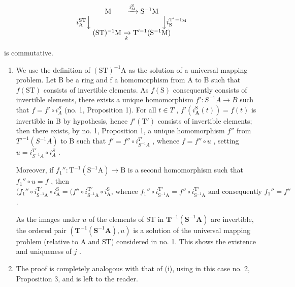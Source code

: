 \[
\begin{array}{c} \mathrm{M} \qquad \xrightarrow {i _ {\mathrm{M}} ^ {\mathrm{S}}} \mathrm{S} ^ {- 1} \mathrm{M} \\ i _ {\mathrm{A}} ^ {\mathrm{ST}} \Big \downarrow \qquad \qquad \qquad \qquad \qquad \Big \downarrow i _ {\mathrm{S}} ^ {\mathrm{T} ^ {\prime} - 1 _ {\mathrm{M}}} \\ (\mathrm{ST}) ^ {- 1} \mathrm{M} \xrightarrow [ k ]{} \mathrm{T} ^ {\prime - 1} (\mathrm{S} ^ {- 1} \mathrm{M}) \end{array}
\]

is commutative.

\begin{enumerate}
\def\labelenumi{(\roman{enumi})}
\tightlist
\item
  We use the definition of \((\mathrm{ST})^{-1}\mathrm{A}\) as the solution of a universal mapping problem. Let B be a ring and f a homomorphism from A to B such that \(f(\mathrm{ST})\) consists of invertible elements. As \(f(\mathrm{S})\) consequently consists of invertible elements, there exists a unique homomorphism \(f': S^{-1}A \to B\) such that \(f = f' \circ i_{A}^{S}\) (no. 1, Proposition 1). For all \(t \in T\) , \(f'(i_{\mathbf{A}}^{\mathrm{S}}(t)) = f(t)\) is invertible in B by hypothesis, hence \(f'(\mathrm{T}')\) consists of invertible elements; then there exists, by no. 1, Proposition 1, a unique homomorphism \(f''\) from \(T'^{-1}(S^{-1}A)\) to B such that \(f' = f'' \circ i_{S^{-1}A}^{T'}\) , whence \(f = f'' \circ u\) , setting \(u = i_{S^{-1}A}^{T'} \circ i_{A}^{S}\) .

Moreover, if \(f_1'' \colon \mathrm{T}^{-1}(\mathrm{S}^{-1}\mathrm{A}) \to \mathrm{B}\) is a second homomorphism such that \(f_1'' \circ u = f\) , then \((f_1'' \circ i_{\mathrm{S}^{-1}\mathrm{A}}^{\mathrm{T}'} \circ i_{\mathrm{A}}^{\mathrm{S}} = (f'' \circ i_{\mathrm{S}^{-1}\mathrm{A}}^{\mathrm{T}'} \circ i_{\mathrm{A}}^{\mathrm{S}} \text{, whence } f_1'' \circ i_{\mathrm{S}^{-1}\mathrm{A}}^{\mathrm{T}'} = f'' \circ i_{\mathrm{S}^{-1}\mathrm{A}}^{\mathrm{T}'} \text{ and consequently } f_1'' = f''\) .

As the images under \(u\) of the elements of ST in \(\mathbf{T}^{-1}(\mathbf{S}^{-1}\mathbf{A})\) are invertible, the ordered pair \((\mathbf{T}^{-1}(\mathbf{S}^{-1}\mathbf{A}), u)\) is a solution of the universal mapping problem (relative to A and ST) considered in no. 1. This shows the existence and uniqueness of \(j\) .

\item
  The proof is completely analogous with that of (i), using in this case no. 2, Proposition 3, and is left to the reader.
\end{enumerate}

